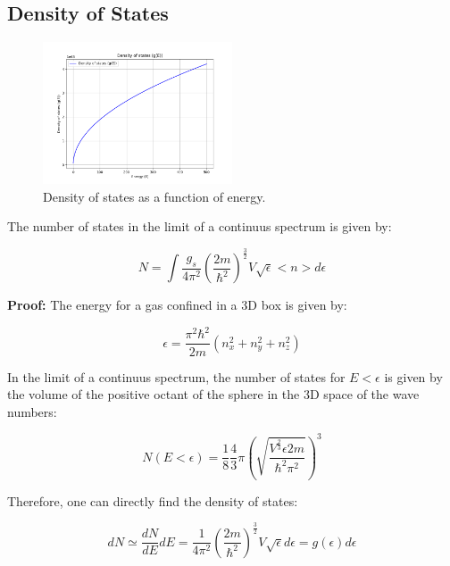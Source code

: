 \documentclass{article}
\begin{document}
\subsection{Density of States}

\begin{figure}[h]
    \centering
    \includegraphics[width=0.5\textwidth]{images/state-density.png}
    \caption{Density of states as a function of energy.}
    \label{fig:density-of-states}
\end{figure}

\begin{tcolorbox}[colframe=gray!50, colback=gray!10, coltitle=black, title=Number of states]
    The number of states in the limit of a continuus spectrum is given by:

    \begin{equation}
        N=\int \frac{g_s}{4\pi^2}\left( \frac{2m}{\hbar^2} \right)^{\frac{3}{2}}V\sqrt{\epsilon} <n>d\epsilon
    \end{equation}
\end{tcolorbox}

\textbf{Proof:}
The energy for a gas confined in a 3D box is given by:

\begin{equation}
    \epsilon=\frac{\pi^2\hbar^2}{2m}(n_x^2+n_y^2+n_z^2)
\end{equation}

In the limit of a continuus spectrum, the number of states for $E<\epsilon$ is given by the volume of the
positive octant of the sphere in the 3D space of the wave numbers:

\begin{equation}
    N(E<\epsilon)= \frac{1}{8} \frac{4}{3}\pi \left(\sqrt{\frac{V^\frac{2}{3} \epsilon 2m}{\hbar^2\pi^2}}\right)^3
\end{equation}

Therefore, one can directly find the density of states:

\begin{equation}
    dN\simeq\frac{dN}{dE}dE=\frac{1}{4\pi^2}\left(\frac{2m}{\hbar^2}\right)^{\frac{3}{2}}V\sqrt{\epsilon}d\epsilon=g(\epsilon)d\epsilon
\end{equation}
\end{document}
